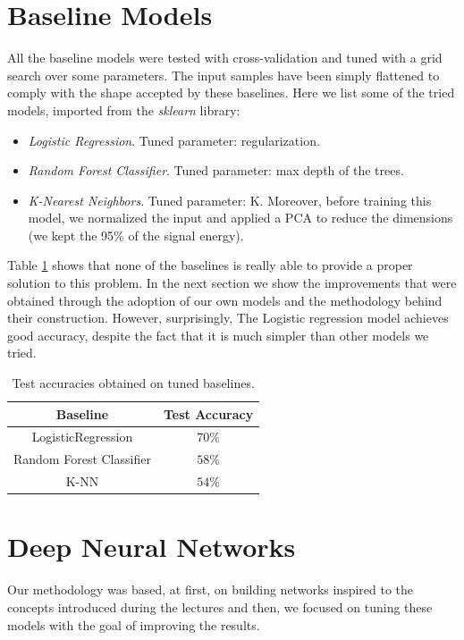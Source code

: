 \documentclass[10pt,conference,compsocconf]{IEEEtran}
\begin{document}
\section{Baseline Models}
\label{sec:baseline}
All the baseline models were tested with cross-validation and tuned with a grid search over some parameters. The input samples have been simply flattened to comply with the shape accepted by these baselines. Here we list some of the tried models, imported from the \textit{sklearn} library:
\begin{itemize}
\item \textit{Logistic Regression}. Tuned parameter: regularization. 
\item \textit{Random Forest Classifier}. Tuned parameter: max depth of the trees.
\item \textit{K-Nearest Neighbors}. Tuned parameter: K. Moreover, before training this model, we normalized the input and applied a PCA to reduce the dimensions (we kept the 95\% of the signal energy).
\end{itemize}

Table \ref{tab:baselineres} shows that none of the baselines is really able to provide a proper solution to this problem. In the next section we show the improvements that were obtained through the adoption of our own models and the methodology behind their construction. However, surprisingly, The Logistic regression model achieves good accuracy, despite the fact that it is much simpler than other models we tried.

\begin{table}[H]
\caption{Test accuracies obtained on tuned baselines.}
\label{tab:baselineres}
\centering
\begin{tabular}{ | c | c | }
\hline
Baseline & Test Accuracy \\
\hline
LogisticRegression & $70\%$ \\
\hline
Random Forest Classifier & $58\%$ \\
\hline
K-NN & $54\%$ \\
\hline
\end{tabular}
\end{table}

\section{Deep Neural Networks}
\label{sec:deep}
Our methodology was based, at first, on building networks inspired to the concepts introduced during the lectures and then, we focused on tuning these models with the goal of improving the results.
\end{document}
